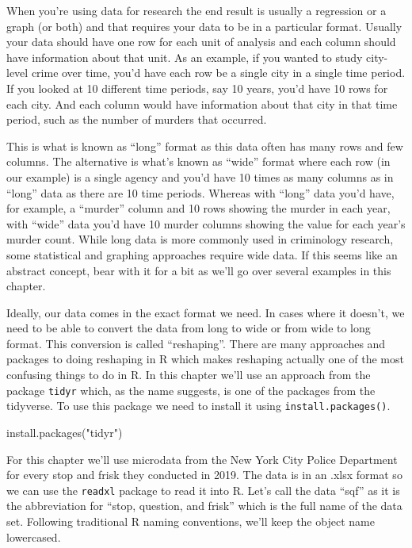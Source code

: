\documentclass[
]{krantz}
\makeatletter
\newenvironment{Shaded}{\begin{snugshade}}{\end{snugshade}}
\newcommand{\FunctionTok}[1]{\textcolor[rgb]{0,0,0}{#1}}
\newcommand{\NormalTok}[1]{#1}
\newcommand{\StringTok}[1]{\textcolor[rgb]{0.5,0.5,0.5}{#1}}
\newenvironment{kframe}{%
\medskip{}
\setlength{\fboxsep}{.8em}
 \def\at@end@of@kframe{}%
 \ifinner\ifhmode%
  \def\at@end@of@kframe{\end{minipage}}%
  \begin{minipage}{\columnwidth}%
 \fi\fi%
 \def\FrameCommand##1{\hskip\@totalleftmargin \hskip-\fboxsep
 \colorbox{shadecolor}{##1}\hskip-\fboxsep
     \hskip-\linewidth \hskip-\@totalleftmargin \hskip\columnwidth}%
 \MakeFramed {\advance\hsize-\width
   \@totalleftmargin\z@ \linewidth\hsize
   \@setminipage}}%
 {\par\unskip\endMakeFramed%
 \at@end@of@kframe}
\renewenvironment{Shaded}{\begin{kframe}}{\end{kframe}}
\makeatother
\begin{document}
When you're using data for research the end result is usually a regression or a graph (or both) and that requires your data to be in a particular format. Usually your data should have one row for each unit of analysis and each column should have information about that unit. As an example, if you wanted to study city-level crime over time, you'd have each row be a single city in a single time period. If you looked at 10 different time periods, say 10 years, you'd have 10 rows for each city. And each column would have information about that city in that time period, such as the number of murders that occurred.

This is what is known as ``long'' format as this data often has many rows and few columns. The alternative is what's known as ``wide'' format where each row (in our example) is a single agency and you'd have 10 times as many columns as in ``long'' data as there are 10 time periods. Whereas with ``long'' data you'd have, for example, a ``murder'' column and 10 rows showing the murder in each year, with ``wide'' data you'd have 10 murder columns showing the value for each year's murder count. While long data is more commonly used in criminology research, some statistical and graphing approaches require wide data. If this seems like an abstract concept, bear with it for a bit as we'll go over several examples in this chapter.

Ideally, our data comes in the exact format we need. In cases where it doesn't, we need to be able to convert the data from long to wide or from wide to long format. This conversion is called ``reshaping''. There are many approaches and packages to doing reshaping in R which makes reshaping actually one of the most confusing things to do in R. In this chapter we'll use an approach from the package \texttt{tidyr} which, as the name suggests, is one of the packages from the tidyverse. To use this package we need to install it using \texttt{install.packages()}.

\begin{Shaded}
\begin{Highlighting}[]
\FunctionTok{install.packages}\NormalTok{(}\StringTok{"tidyr"}\NormalTok{)}
\end{Highlighting}
\end{Shaded}

For this chapter we'll use microdata from the New York City Police Department for every stop and frisk they conducted in 2019. The data is in an .xlsx format so we can use the \texttt{readxl} package to read it into R. Let's call the data ``sqf'' as it is the abbreviation for ``stop, question, and frisk'' which is the full name of the data set. Following traditional R naming conventions, we'll keep the object name lowercased.
\end{document}
